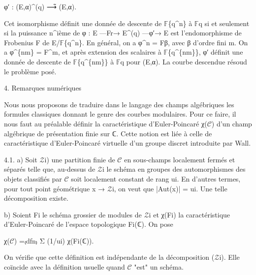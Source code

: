 \documentclass[11pt,a4paper]{article}
\begin{document}
φ′ : (E,α)\textasciicircum{}(q) ⟶̃ (E,α).

Cet isomorphisme définit une donnée de descente de \ensuremath{\mathbb{F}}\textunderscore{}\{q\textasciicircum{}n\} à \ensuremath{\mathbb{F}}\textunderscore{}q si et seulement si la puissance n\textasciicircum{}ième de φ : E —Fr→ E\textasciicircum{}(q) —φ′→ E est l'endomorphisme de Frobenius F de E/\ensuremath{\mathbb{F}}\textunderscore{}\{q\textasciicircum{}n\}. En général, on a φ\textasciicircum{}n = Fβ, avec β d'ordre fini m. On a φ\textasciicircum{}\{nm\} = F\textasciicircum{}m, et après extension des scalaires à \ensuremath{\mathbb{F}}\textunderscore{}\{q\textasciicircum{}\{nm\}\}, φ′ définit une donnée de descente de \ensuremath{\mathbb{F}}\textunderscore{}\{q\textasciicircum{}\{nm\}\} à \ensuremath{\mathbb{F}}\textunderscore{}q pour (E,α). La courbe descendue résoud le problème posé.

4. Remarques numériques

Nous nous proposons de traduire dans le langage des champs algébriques les formules classiques donnant le genre des courbes modulaires. Pour ce faire, il nous faut au préalable définir la caractéristique d'Euler-Poincaré χ(\ensuremath{\mathcal{C}}) d'un champ algébrique de présentation finie sur ℂ. Cette notion est liée à celle de caractéristique d'Euler-Poincaré virtuelle d'un groupe discret introduite par Wall.

4.1. a) Soit \ensuremath{\mathcal{Z}}\textunderscore{}i) une partition finie de \ensuremath{\mathcal{C}} en sous-champs localement fermés et séparés telle que, au-dessus de \ensuremath{\mathcal{Z}}\textunderscore{}i le schéma en groupes des automorphismes des objets classifiés par \ensuremath{\mathcal{C}} soit localement constant de rang u\textunderscore{}i. En d'autres termes, pour tout point géométrique x → \ensuremath{\mathcal{Z}}\textunderscore{}i, on veut que |Aut(x)| = u\textunderscore{}i. Une telle décomposition existe.

b) Soient F\textunderscore{}i le schéma grossier de modules de \ensuremath{\mathcal{Z}}\textunderscore{}i et χ(F\textunderscore{}i) la caractéristique d'Euler-Poincaré de l'espace topologique F\textunderscore{}i(ℂ). On pose

χ(\ensuremath{\mathcal{C}}) =₍dfn₎ Σ (1/u\textunderscore{}i) χ(F\textunderscore{}i(ℂ)).

On vérifie que cette définition est indépendante de la décomposition (\ensuremath{\mathcal{Z}}\textunderscore{}i). Elle coïncide avec la définition usuelle quand \ensuremath{\mathcal{C}} "est" un schéma.
\end{document}
